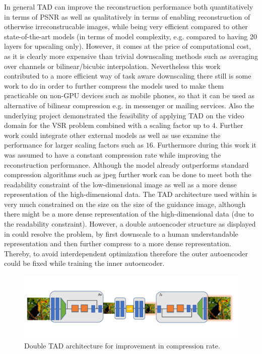 In general \ac{TAD} can improve the reconstruction performance both quantitatively in terms of \ac{PSNR} as well as qualitatively in terms of enabling reconstruction of otherwise irreconstrucable images, while being very efficient compared to other state-of-the-art models (in terms of model complexity, e.g. compared to  having 20 layers for upscaling only). However, it comes at the price of computational cost, as it is clearly more expensive than trivial downscaling methods such as averaging over channels or bilinear/bicubic interpolation. Nevertheless this work contributed to a more efficient way of task aware downscaling there still is some work to do in order to further compress the models used to make them practicable on non-GPU devices such as mobile phones, so that it can be used as alternative of bilinear compression e.g. in messenger or mailing services. Also the underlying project demonstrated the feasibility of applying \ac{TAD} on the video domain for the \ac{VSR} problem combined with a scaling factor up to $4$. Further work could integrate other external models as well as use examine the performance for larger scaling factors such as $16$. Furthermore during this work it was assumed to have a constant compression rate while improving the reconstruction performance. Although the model already outperforms standard compression algorithms such as jpeg further work can be done to meet both the readability constraint of the low-dimensional image as well as a more dense representation of the high-dimensional data. The \ac{TAD} architecture used within is very much constrained on the size on the size of the guidance image, although there might be a more dense representation of the high-dimensional data (due to the readability constraint). However, a double autoencoder structure as displayed in  could resolve the problem, by first downscale to a human understandable representation and then further compress to a more dense representation. Thereby, to avoid interdependent optimization therefore the outer autoencoder could be fixed while training the inner autoencoder. 

\begin{figure}[!htbp]
	\centering
	\includegraphics[width=16cm]{figures/future_work_double_tad.png}
	\caption{Double \ac{TAD} architecture for improvement in compression rate.}
  \label{fig:future_work_double_tad}
\end{figure}

